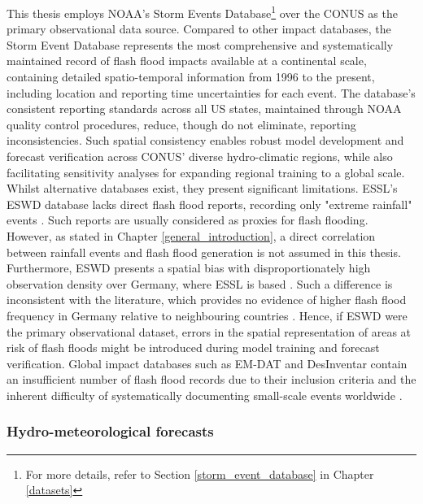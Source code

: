 This  thesis employs NOAA's Storm Events Database\footnote{For more details, refer to Section \ref{storm_event_database} in Chapter \ref{datasets}} over the CONUS as the primary observational data source. Compared to other impact databases, the Storm Event Database represents the most comprehensive and systematically maintained record of flash flood impacts available at a continental scale, containing detailed spatio-temporal information from 1996 to the present, including location and reporting time uncertainties for each event. The database's consistent reporting standards across all US states, maintained through NOAA quality control procedures, reduce, though do not eliminate, reporting inconsistencies. Such spatial consistency enables robust model development and forecast verification across CONUS' diverse hydro-climatic regions, while also facilitating sensitivity analyses for expanding regional training to a global scale. Whilst alternative databases exist, they present significant limitations. ESSL's ESWD database lacks direct flash flood reports, recording only "extreme rainfall" events \citep{Dotzek_2009}. Such reports are usually considered as proxies for flash flooding. However, as stated in Chapter \ref{general_introduction}, a direct correlation between rainfall events and flash flood generation is not assumed in this thesis. Furthermore, ESWD presents a spatial bias with disproportionately high observation density over Germany, where ESSL is based \citep{Dotzek_2009}. Such a difference is inconsistent with the literature, which provides no evidence of higher flash flood frequency in Germany relative to neighbouring countries \citep{Gaume_2009}. Hence, if ESWD were the primary observational dataset, errors in the spatial representation of areas at risk of flash floods might be introduced during model training and forecast verification. Global impact databases such as EM-DAT and DesInventar contain an insufficient number of flash flood records due to their inclusion criteria and the inherent difficulty of systematically documenting small-scale events worldwide \citep{Panwar_2020}.

\subsubsection{Hydro-meteorological forecasts}

